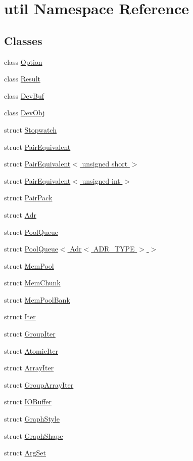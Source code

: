 \hypertarget{namespaceutil}{\section{util Namespace Reference}
\label{namespaceutil}
}
\subsection*{Classes}
\begin{DoxyCompactItemize}
\item 
class \hyperlink{classutil_1_1Option}{Option}
\item 
class \hyperlink{classutil_1_1Result}{Result}
\item 
class \hyperlink{classutil_1_1DevBuf}{Dev\-Buf}
\item 
class \hyperlink{classutil_1_1DevObj}{Dev\-Obj}
\item 
struct \hyperlink{structutil_1_1Stopwatch}{Stopwatch}
\item 
struct \hyperlink{structutil_1_1PairEquivalent}{Pair\-Equivalent}
\item 
struct \hyperlink{structutil_1_1PairEquivalent_3_01unsigned_01short_01_4}{Pair\-Equivalent$<$ unsigned short $>$}
\item 
struct \hyperlink{structutil_1_1PairEquivalent_3_01unsigned_01int_01_4}{Pair\-Equivalent$<$ unsigned int $>$}
\item 
struct \hyperlink{structutil_1_1PairPack}{Pair\-Pack}
\item 
struct \hyperlink{structutil_1_1Adr}{Adr}
\item 
struct \hyperlink{structutil_1_1PoolQueue}{Pool\-Queue}
\item 
struct \hyperlink{structutil_1_1PoolQueue_3_01Adr_3_01ADR__TYPE_01_4_01_4}{Pool\-Queue$<$ Adr$<$ A\-D\-R\-\_\-\-T\-Y\-P\-E $>$ $>$}
\item 
struct \hyperlink{structutil_1_1MemPool}{Mem\-Pool}
\item 
struct \hyperlink{structutil_1_1MemChunk}{Mem\-Chunk}
\item 
struct \hyperlink{structutil_1_1MemPoolBank}{Mem\-Pool\-Bank}
\item 
struct \hyperlink{structutil_1_1Iter}{Iter}
\item 
struct \hyperlink{structutil_1_1GroupIter}{Group\-Iter}
\item 
struct \hyperlink{structutil_1_1AtomicIter}{Atomic\-Iter}
\item 
struct \hyperlink{structutil_1_1ArrayIter}{Array\-Iter}
\item 
struct \hyperlink{structutil_1_1GroupArrayIter}{Group\-Array\-Iter}
\item 
struct \hyperlink{structutil_1_1IOBuffer}{I\-O\-Buffer}
\item 
struct \hyperlink{structutil_1_1GraphStyle}{Graph\-Style}
\item 
struct \hyperlink{structutil_1_1GraphShape}{Graph\-Shape}
\item 
struct \hyperlink{structutil_1_1ArgSet}{Arg\-Set}
\end{DoxyCompactItemize}
